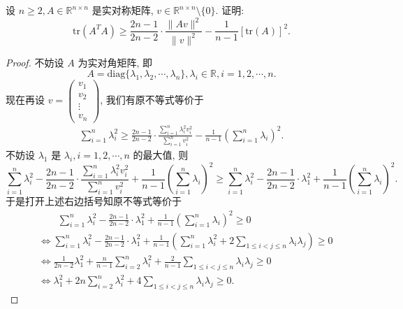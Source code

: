\documentclass[../../main.tex]{subfiles}%
\begin{document}
\begin{example}
设 \( n \geqslant 2, A \in \mathbb{R}^{n \times n} \) 是实对称矩阵, \( v \in \mathbb{R}^{n \times n} \setminus \{0\} \). 证明:
\[
\text{tr}(A^TA) \geqslant \frac{2n - 1}{2n - 2} \cdot \frac{\|Av\|^2}{\|v\|^2} - \frac{1}{n - 1}[\text{tr}(A)]^2.
\]
\end{example}
\begin{proof}
不妨设 \( A \) 为实对角矩阵, 即
\[
A = \text{diag}\{\lambda_1, \lambda_2, \cdots, \lambda_n\}, \lambda_i \in \mathbb{R}, i = 1,2,\cdots, n.
\]
现在再设 \( v = \begin{pmatrix} v_1 \\ v_2 \\ \vdots \\ v_n \end{pmatrix} \), 我们有原不等式等价于
\begin{align*}
\sum\limits_{i=1}^n \lambda_i^2 \geqslant \frac{2n - 1}{2n - 2} \cdot \frac{\sum\limits_{i=1}^n \lambda_i^2 v_i^2}{\sum\limits_{i=1}^n v_i^2} - \frac{1}{n - 1} \left( \sum\limits_{i=1}^n \lambda_i \right)^2. 
\end{align*}
不妨设 \( \lambda_1 \) 是 \( \lambda_i, i = 1,2,\cdots, n \) 的最大值, 则
\[
\sum\limits_{i=1}^n \lambda_i^2 - \frac{2n - 1}{2n - 2} \cdot \frac{\sum\limits_{i=1}^n \lambda_i^2 v_i^2}{\sum\limits_{i=1}^n v_i^2} + \frac{1}{n - 1} \left( \sum\limits_{i=1}^n \lambda_i \right)^2 \geqslant \sum\limits_{i=1}^n \lambda_i^2 - \frac{2n - 1}{2n - 2} \cdot \lambda_1^2 + \frac{1}{n - 1} \left( \sum\limits_{i=1}^n \lambda_i \right)^2.
\]
于是打开上述右边括号知原不等式等价于
\begin{align}
&\quad \quad \sum\limits_{i=1}^n{\lambda _{i}^{2}}-\frac{2n-1}{2n-2}\cdot \lambda _{1}^{2}+\frac{1}{n-1}\left( \sum\limits_{i=1}^n{\lambda _i} \right) ^2\geqslant 0
\nonumber \\
&\Longleftrightarrow \sum\limits_{i=1}^n{\lambda _{i}^{2}}-\frac{2n-1}{2n-2}\cdot \lambda _{1}^{2}+\frac{1}{n-1}\left( \sum\limits_{i=1}^n{\lambda _{i}^{2}}+2\sum\limits_{1\leqslant i<j\leqslant n}{\lambda _i\lambda _j} \right) \geqslant 0
\nonumber \\
&\Longleftrightarrow \frac{1}{2n-2}\lambda _{1}^{2}+\frac{n}{n-1}\sum\limits_{i=2}^n{\lambda _{i}^{2}}+\frac{2}{n-1}\sum\limits_{1\leqslant i<j\leqslant n}{\lambda _i\lambda _j}\geqslant 0
\nonumber \\
&\Longleftrightarrow \lambda _{1}^{2}+2n\sum\limits_{i=2}^n{\lambda _{i}^{2}}+4\sum\limits_{1\leqslant i<j\leqslant n}{\lambda _i\lambda _j}\geqslant 0.\label{eq:::-----1568165435
}
\end{align}
\end{proof}
\end{document}

